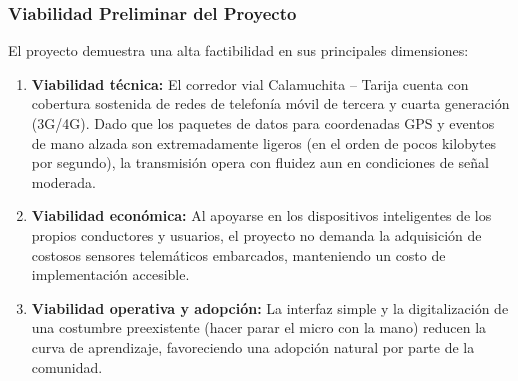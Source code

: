 \subsubsection{Viabilidad Preliminar del Proyecto}

El proyecto demuestra una alta factibilidad en sus principales dimensiones:

\begin{enumerate}[label=\alph*)]
    \item \textbf{Viabilidad técnica:} El corredor vial Calamuchita -- Tarija cuenta con cobertura sostenida de redes de telefonía móvil de tercera y cuarta generación (3G/4G). Dado que los paquetes de datos para coordenadas GPS y eventos de mano alzada son extremadamente ligeros (en el orden de pocos kilobytes por segundo), la transmisión opera con fluidez aun en condiciones de señal moderada.
    \item \textbf{Viabilidad económica:} Al apoyarse en los dispositivos inteligentes de los propios conductores y usuarios, el proyecto no demanda la adquisición de costosos sensores telemáticos embarcados, manteniendo un costo de implementación accesible.
    \item \textbf{Viabilidad operativa y adopción:} La interfaz simple y la digitalización de una costumbre preexistente (hacer parar el micro con la mano) reducen la curva de aprendizaje, favoreciendo una adopción natural por parte de la comunidad.
\end{enumerate}
